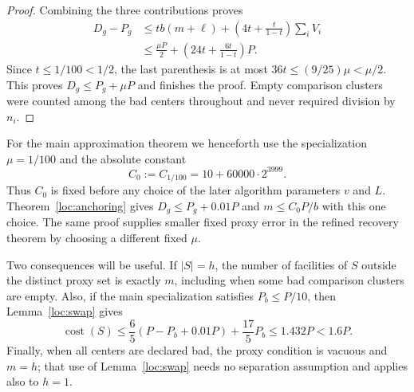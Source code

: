 \begin{proof}
Combining the three contributions proves
\begin{align*}
 D_g-P_g
 &\le tb(m+\ell)+\left(4t+\frac{t}{1-t}\right)\sum_iV_i\\
 &\le\frac{\mu P}{2}
       +\left(24t+\frac{6t}{1-t}\right)P.
\end{align*}
Since $t\le1/100<1/2$, the last parenthesis is at most
$36t\le(9/25)\mu<\mu/2$.  This proves $D_g\le P_g+\mu P$ and finishes
the proof.  Empty comparison clusters were counted among the bad
centers throughout and never required division by $n_i$.
\end{proof}

For the main approximation theorem we henceforth use the specialization
$\mu=1/100$ and the absolute constant
\begin{equation}
 C_0:=C_{1/100}=10+60000\cdot2^{3999}.
 \label{loc:main-count-constant}
\end{equation}
Thus $C_0$ is fixed before any choice of the later algorithm parameters
$v$ and $L$.  Theorem~\ref{loc:anchoring} gives
$D_g\le P_g+0.01P$ and $m\le C_0P/b$ with this one choice.  The same
proof supplies smaller fixed proxy error in the refined recovery
theorem by choosing a different fixed $\mu$.

Two consequences will be useful.  If $|S|=h$, the number of facilities
of $S$ outside the distinct proxy set is exactly $m$, including when
some bad comparison clusters are empty.  Also, if the main
specialization satisfies $P_b\le P/10$, then
Lemma~\ref{loc:swap} gives
\begin{equation}
 \operatorname{cost}(S)
 \le\frac65(P-P_b+0.01P)+\frac{17}{5}P_b
 \le1.432P<1.6P.
 \label{loc:small-bad-cost}
\end{equation}
Finally, when all centers are declared bad, the proxy condition is
vacuous and $m=h$; that use of Lemma~\ref{loc:swap} needs no separation
assumption and applies also to $h=1$.
